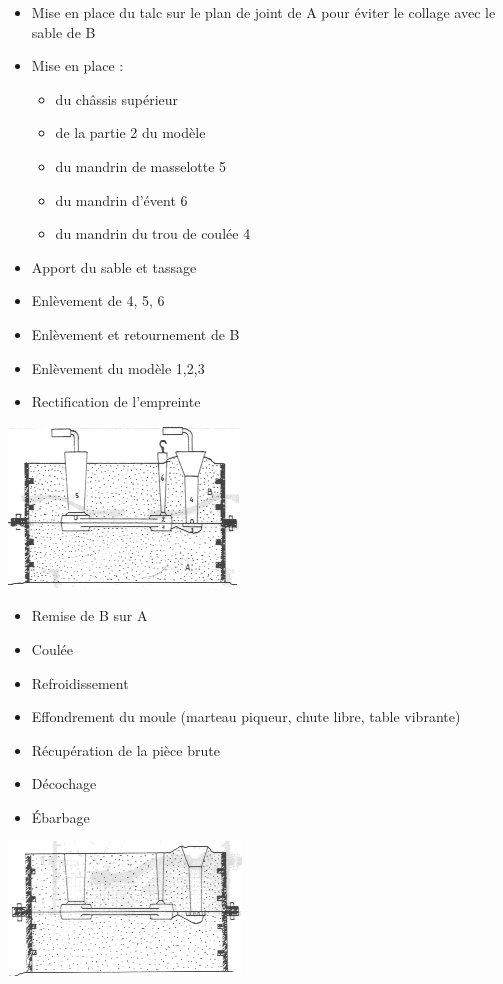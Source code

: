 \documentclass[11pt,oneside]{article}
\begin{document}
\begin{multicols}{2}
\begin{itemize}
 \item Mise en place du talc sur le plan de joint de A pour éviter le collage
avec le sable de B
\item Mise en place : 
\begin{itemize}
 \item du châssis supérieur
\item de la partie 2 du modèle
\item du mandrin de masselotte 5
\item du mandrin d'évent 6
\item du mandrin du trou de coulée 4
\end{itemize}
\item Apport du sable et tassage
\item Enlèvement de 4, 5, 6
\item Enlèvement et retournement de B
\item Enlèvement du modèle 1,2,3
\item Rectification de l'empreinte
\end{itemize}

\begin{center}
 \includegraphics[width=.42\textwidth]{png/moulage4}
\end{center}
\end{multicols}

\begin{multicols}{2}
\begin{itemize}
 \item Remise de B sur A
\item Coulée
\item Refroidissement 
\item Effondrement du moule (marteau piqueur, chute libre, table vibrante)
\item Récupération de la pièce brute
\item Décochage
\item Ébarbage
\end{itemize}

\begin{center}
 \includegraphics[width=.3\textwidth]{png/moulage5}
\end{center}
\end{multicols}
\end{document}
